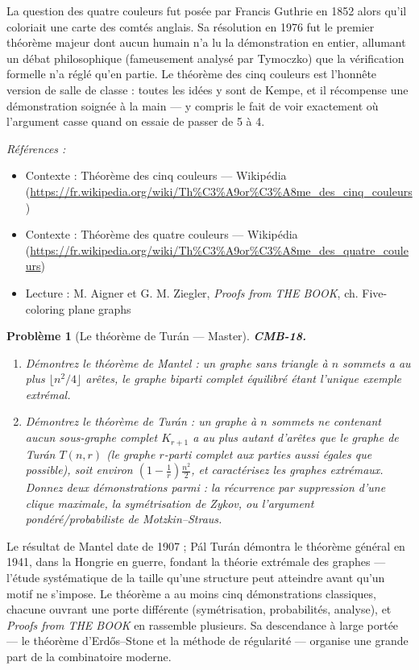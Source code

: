 \documentclass[11pt]{article}
\newtheorem{problem}{Problème}
\newenvironment{refs}{\par\small\noindent\emph{Références :}\begin{itemize}\setlength\itemsep{0pt}}{\end{itemize}\normalsize}
\begin{document}
\noindent La question des quatre couleurs fut posée par Francis Guthrie en 1852 alors
qu'il coloriait une carte des comtés anglais. Sa résolution en 1976 fut le premier théorème
majeur dont aucun humain n'a lu la démonstration en entier, allumant un débat philosophique
(fameusement analysé par Tymoczko) que la vérification formelle n'a réglé qu'en partie. Le
théorème des cinq couleurs est l'honnête version de salle de classe : toutes les idées y sont de
Kempe, et il récompense une démonstration soignée à la main --- y compris le fait de voir
exactement où l'argument casse quand on essaie de passer de 5 à 4.

\begin{refs}
\item Contexte : Théorème des cinq couleurs --- Wikipédia (\url{https://fr.wikipedia.org/wiki/Th%C3%A9or%C3%A8me_des_cinq_couleurs})
\item Contexte : Théorème des quatre couleurs --- Wikipédia (\url{https://fr.wikipedia.org/wiki/Th%C3%A9or%C3%A8me_des_quatre_couleurs})
\item Lecture : M. Aigner et G. M. Ziegler, \textit{Proofs from THE BOOK}, ch. \og{} Five-coloring plane graphs \fg{}
\end{refs}

\bigskip

\begin{problem}[{Le théorème de Turán --- Master}]
\textbf{CMB-18.} \begin{enumerate}
\item[(a)] Démontrez le théorème de Mantel : un graphe sans triangle à $ n $ sommets a au plus
$ \lfloor n^2/4 \rfloor $ arêtes, le graphe biparti complet équilibré étant l'unique exemple
extrémal.
\item[(b)] Démontrez le théorème de Turán : un graphe à $ n $ sommets ne contenant aucun sous-graphe
complet $ K_{r+1} $ a au plus autant d'arêtes que le graphe de Turán $ T(n,r) $ (le graphe
$ r $-parti complet aux parties aussi égales que possible), soit environ
$ \left(1 - \frac{1}{r}\right)\frac{n^2}{2} $, et caractérisez les graphes extrémaux. Donnez
deux démonstrations parmi : la récurrence par suppression d'une clique maximale, la symétrisation
de Zykov, ou l'argument pondéré/probabiliste de Motzkin--Straus.
\end{enumerate}

\end{problem}

\noindent Le résultat de Mantel date de 1907 ; Pál Turán démontra le théorème général en
1941, dans la Hongrie en guerre, fondant la théorie extrémale des graphes --- l'étude systématique
de la taille qu'une structure peut atteindre avant qu'un motif ne s'impose. Le théorème a au moins
cinq démonstrations classiques, chacune ouvrant une porte différente (symétrisation, probabilités,
analyse), et \textit{Proofs from THE BOOK} en rassemble plusieurs. Sa descendance à large portée ---
le théorème d'Erd\H{o}s--Stone et la méthode de régularité --- organise une grande part de la
combinatoire moderne.
\end{document}
